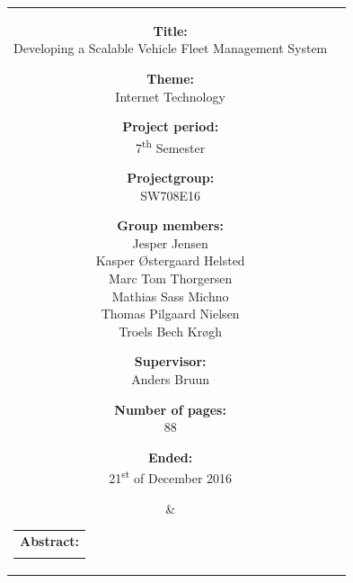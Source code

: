 \begin{titlepage}
\begin{nopagebreak}
{            \noindent
            \begin{tabular}{cc}
                \parbox[t]{.40\textwidth}{
                    \begin{description}
                        \item {\bf Title:}\\
                        Developing a Scalable Vehicle Fleet Management System
                        \item {\bf Theme:}\\
                        Internet Technology
                        \item {\bf Project period:}\\
                            7\textsuperscript{th} Semester
                            \hspace{4cm}
                        \item {\bf Projectgroup:}\\
                            SW708E16
                            \hspace{4cm}
                        \item {\bf Group members:}\\
                        Jesper Jensen \\
                        Kasper Østergaard Helsted \\
                        Marc Tom Thorgersen \\
                        Mathias Sass Michno \\
                        Thomas Pilgaard Nielsen \\
                        Troels Bech Krøgh
                        \item {\bf Supervisor:}\\
                            Anders Bruun
                        \item {\bf Number of pages:}\\
                            88
                        \item {\bf Ended:}\\
                            21\textsuperscript{st} of December 2016
                    \end{description}
                } &
                \parbox[t]{.45\textwidth}{
                    \begin{tabular}[t]{l}
                        {\bf Abstract:}\bigskip \\
                        \fbox{
                            \parbox{.45\textwidth}{\smallskip
                                {\vfill{\small
                                        
                                \smallskip}}
                            }
                        }
                    \end{tabular}
                }
            \end{tabular}
        }
    \end{nopagebreak}
\end{titlepage}
